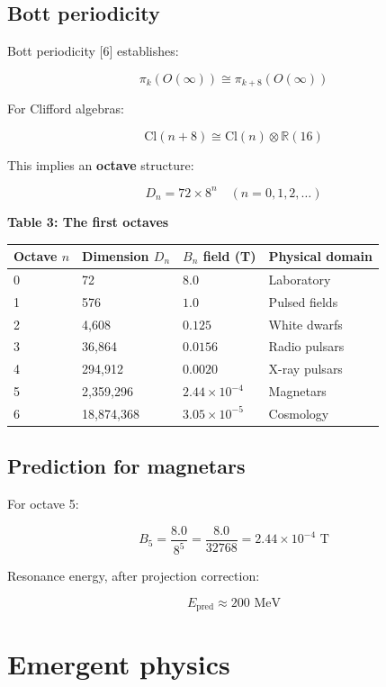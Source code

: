 \documentclass[11pt]{article}
\begin{document}
\hypertarget{bott-periodicity}{%
\subsection{Bott periodicity}\label{bott-periodicity}}

Bott periodicity {[}6{]} establishes:

\[\pi_k(O(\infty)) \cong \pi_{k+8}(O(\infty))\]

For Clifford algebras:

\[\text{Cl}(n+8) \cong \text{Cl}(n) \otimes \mathbb{R}(16)\]

This implies an \textbf{octave} structure:

\[D_n = 72 \times 8^n \quad (n = 0, 1, 2, \ldots)\]

\textbf{Table 3: The first octaves}

\begin{longtable}[]{@{}llll@{}}
\toprule
Octave \(n\) & Dimension \(D_n\) & \(B_n\) field (T) & Physical
domain \\
\midrule
\endhead
0 & 72 & \(8.0\) & Laboratory \\
1 & 576 & \(1.0\) & Pulsed fields \\
2 & 4,608 & \(0.125\) & White dwarfs \\
3 & 36,864 & \(0.0156\) & Radio pulsars \\
4 & 294,912 & \(0.0020\) & X-ray pulsars \\
5 & 2,359,296 & \(2.44\times10^{-4}\) & Magnetars \\
6 & 18,874,368 & \(3.05\times10^{-5}\) & Cosmology \\
\bottomrule
\end{longtable}

\hypertarget{prediction-for-magnetars}{%
\subsection{Prediction for magnetars}\label{prediction-for-magnetars}}

For octave 5:

\[B_5 = \frac{8.0}{8^5} = \frac{8.0}{32768} = 2.44 \times 10^{-4} \text{ T}\]

Resonance energy, after projection correction:

\[E_{\text{pred}} \approx 200 \text{ MeV}\]

\hypertarget{emergent-physics}{%
\section{Emergent physics}\label{emergent-physics}}
\end{document}
